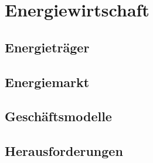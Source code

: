 \section{Energiewirtschaft}

\subsection{Energieträger}

\subsection{Energiemarkt}

\subsection{Geschäftsmodelle}

\subsection{Herausforderungen}

\newpage